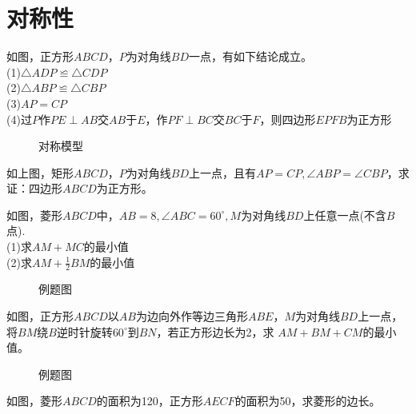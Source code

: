 \section{对称性}
\begin{definition}
    如图，正方形$ABCD$，$P$为对角线$BD$一点，有如下结论成立。\\
    (1)$\triangle ADP \backcong \triangle CDP$ \\
    (2)$\triangle ABP \backcong \triangle CBP$ \\
    (3)$AP=CP$ \\
    (4)过$P$作$PE\perp AB$交$AB$于$E$，作$PF\perp BC$交$BC$于$F$，则四边形$EPFB$为正方形 \\
\end{definition}
\begin{figure}[H]
    \centering
    \resizebox{4cm}{!}{}
    \caption{对称模型}
\end{figure}
\begin{problem}
如上图，矩形$ABCD$，$P$为对角线$BD$上一点，且有$AP=CP,\angle ABP=\angle CBP$，求证：四边形$ABCD$为正方形。
\end{problem}
\begin{example}
    如图，菱形$ABCD$中，$AB=8,\angle ABC=60^\circ,M$为对角线$BD$上任意一点(不含$B$点). \\
    (1)求$AM+MC$的最小值 \\
    (2)求$AM+\frac{1}{2}BM$的最小值 \\
\end{example}
\begin{figure}[H]
    \centering
    \resizebox{4cm}{!}{}
    \caption{例题图}
\end{figure}
\begin{example}
    如图，正方形$ABCD$以$AB$为边向外作等边三角形$ABE$，$M$为对角线$BD$上一点，将$BM$绕$B$逆时针旋转$60^\circ$到$BN$，若正方形边长为2，求
    $AM+BM+CM$的最小值。
\end{example}
\begin{figure}[H]
    \centering
    \resizebox{4cm}{!}{}
    \caption{例题图}
\end{figure}
\begin{problem}
如图，菱形$ABCD$的面积为120，正方形$AECF$的面积为50，求菱形的边长。\\
\end{problem}
